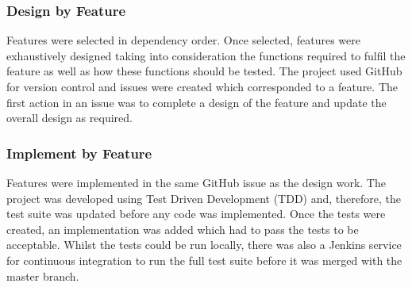 \subsubsection{Design by Feature}
Features were selected in dependency order. Once selected, features were exhaustively designed taking into consideration the functions required to fulfil the feature as well as how these functions should be tested. The project used GitHub for version control and issues were created which corresponded to a feature. The first action in an issue was to complete a design of the feature and update the overall design as required.

\subsubsection{Implement by Feature}
Features were implemented in the same GitHub issue as the design work. The project was developed using Test Driven Development (TDD) and, therefore, the test suite was updated before any code was implemented. Once the tests were created, an implementation was added which had to pass the tests to be acceptable. Whilst the tests could be run locally, there was also a Jenkins service for continuous integration to run the full test suite before it was merged with the master branch.  
